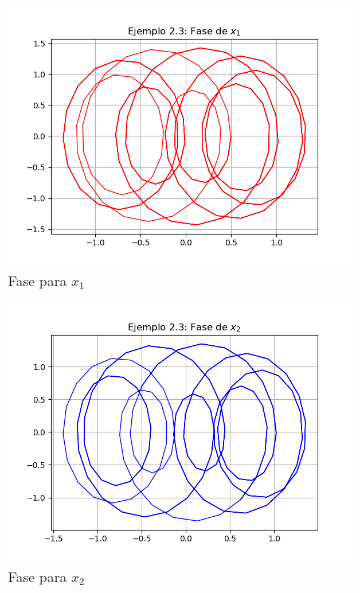 \documentclass[a4paper]{article}
\begin{document}
\begin{figure}[ht!]
\begin{subfigure}{0.6\textwidth}
  \centering
  \includegraphics[width=\linewidth]{ejemplo_2_3_5.png}
   \caption{Fase para $x_1$}
\end{subfigure}
\begin{subfigure}{0.6\textwidth}
  \centering
  \includegraphics[width=\linewidth]{ejemplo_2_3_6.png}
  \caption{Fase para $x_2$}
\end{subfigure}
\begin{subfigure}{0.6\textwidth}
  \centering

\end{subfigure}
\end{figure}
\end{document}
